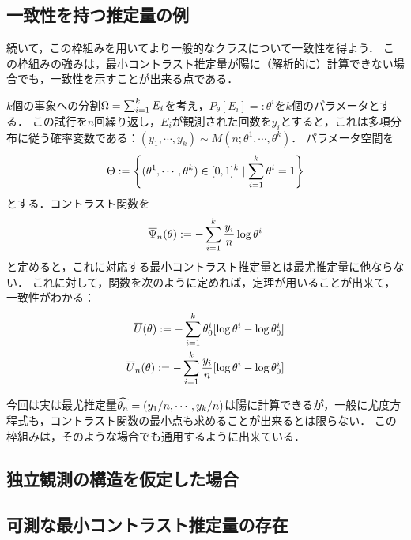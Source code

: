 \documentclass[uplatex,dvipdfmx]{jsreport}
\begin{document}
\subsection{一致性を持つ推定量の例}

\begin{tcolorbox}[colframe=ForestGreen, colback=ForestGreen!10!white,breakable,colbacktitle=ForestGreen!40!white,coltitle=black,fonttitle=\bfseries\sffamily,
title=]
続いて，この枠組みを用いてより一般的なクラスについて一致性を得よう．
この枠組みの強みは，最小コントラスト推定量が陽に（解析的に）計算できない場合でも，一致性を示すことが出来る点である．
\end{tcolorbox}

\begin{example}[多項分布]\label{exp-multinomial-model}
    $k$個の事象への分割$\Omega=\sum^k_{i=1}E_i$を考え，$P_\theta[E_i]=:\theta^i$を$k$個のパラメータとする．
    この試行を$n$回繰り返し，$E_i$が観測された回数を$y_i$とすると，これは多項分布に従う確率変数である：$(y_1,\cdots,y_k)\sim M(n;\theta^1,\cdots,\theta^k)$．
    パラメータ空間を
    \[\Theta:=\left\{(\theta^1,\cdots,\theta^k)\in[0,1]^k\mid\sum^k_{i=1}\theta^i=1\right\}\]
    とする．コントラスト関数を
    \[\overline{\Psi}_n(\theta):=-\sum^k_{i=1}\frac{y_i}{n}\log\theta^i\]
    と定めると，これに対応する最小コントラスト推定量とは最尤推定量に他ならない．
    これに対して，関数を次のように定めれば，定理が用いることが出来て，一致性がわかる：
    \begin{align*}
        \overline{U}(\theta):=-\sum^k_{i=1}\theta^i_0[\log\theta^i-\log\theta^i_0]\\
        \overline{U}_n(\theta):=-\sum^k_{i=1}\frac{y_i}{n}[\log\theta^i-\log\theta^i_0]
    \end{align*}

    今回は実は最尤推定量$\widehat{\theta_n}=(y_1/n,\cdots,y_k/n)$は陽に計算できるが，一般に尤度方程式も，コントラスト関数の最小点も求めることが出来るとは限らない．
    この枠組みは，そのような場合でも通用するように出来ている．
\end{example}

\subsection{独立観測の構造を仮定した場合}

\subsection{可測な最小コントラスト推定量の存在}
\end{document}
